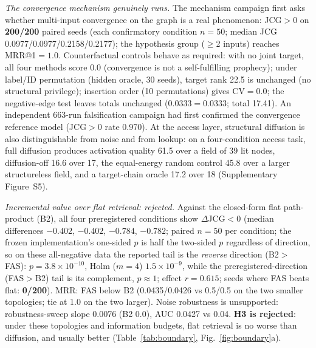 \documentclass[10pt,a4paper]{article}
\begin{document}
\emph{The convergence mechanism genuinely runs.} The mechanism campaign first asks whether multi-input convergence on the graph is a real phenomenon: JCG${>}$0 on \textbf{200/200} paired seeds (each confirmatory condition $n{=}50$; median JCG 0.0977/0.0977/0.2158/0.2177); the hypothesis group ($\ge$2 inputs) reaches MRR@1${=}1.0$. Counterfactual controls behave as required: with no joint target, all four methods score 0.0 (convergence is not a self-fulfilling prophecy); under label/ID permutation (hidden oracle, 30 seeds), target rank 22.5 is unchanged (no structural privilege); insertion order (10 permutations) gives CV${=}0.0$; the negative-edge test leaves totals unchanged (0.0333${=}$0.0333; total 17.41). An independent 663-run falsification campaign had first confirmed the convergence reference model (JCG${>}0$ rate 0.970). At the access layer, structural diffusion is also distinguishable from noise and from lookup: on a four-condition access task, full diffusion produces activation quality 61.5 over a field of 39 lit nodes, diffusion-off 16.6 over 17, the equal-energy random control 45.8 over a larger structureless field, and a target-chain oracle 17.2 over 18 (Supplementary Figure~S5).

\emph{Incremental value over flat retrieval: rejected.} Against the closed-form flat path-product (B2), all four preregistered conditions show $\Delta$JCG${<}0$ (median differences ${-}0.402$, ${-}0.402$, ${-}0.784$, ${-}0.782$; paired $n{=}50$ per condition; the frozen implementation's one-sided $p$ is half the two-sided $p$ regardless of direction, so on these all-negative data the reported tail is the \emph{reverse} direction (B2${>}$FAS): $p{=}3.8\times10^{-10}$, Holm ($m{=}4$) $1.5\times10^{-9}$, while the preregistered-direction (FAS${>}$B2) tail is its complement, $p{\approx}1$; effect $r{=}0.615$; seeds where FAS beats flat: \textbf{0/200}). MRR: FAS below B2 (0.0435/0.0426 vs 0.5/0.5 on the two smaller topologies; tie at 1.0 on the two larger). Noise robustness is unsupported: robustness-sweep slope 0.0076 (B2 0.0), AUC 0.0427 vs 0.04. \textbf{H3 is rejected}: under these topologies and information budgets, flat retrieval is no worse than diffusion, and usually better (Table~\ref{tab:boundary}, Fig.~\ref{fig:boundary}a).
\end{document}

